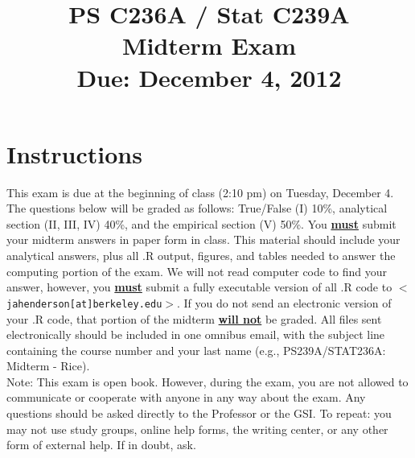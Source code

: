 \documentclass{article}
\title{PS C236A / Stat C239A \\  Midterm Exam \\ Due: December 4, 2012}
\date{}
\begin{document}
\maketitle
\vspace{-4em}
\section*{Instructions}





\noindent This exam is due at the beginning of class (2:10 pm) on
Tuesday, December 4. The questions below will be graded as follows:
True/False (I) 10\%, analytical section (II, III, IV) 40\%, and the
empirical section (V) 50\%.  You \underline{\bf must} submit your
midterm answers in paper form in class.  This material should include
your analytical answers, plus all .R output, figures, and tables
needed to answer the computing portion of the exam.  We will not read
computer code to find your answer, however, you \underline{\bf must}
submit a fully executable version of all .R code to
$<$\texttt{jahenderson[at]berkeley.edu}$>$. If you do not send an
electronic version of your .R code, that portion of the midterm
\underline{\bf will not} be graded.  All files sent electronically
should be included in one omnibus email, with the subject line containing the course number and your last name (e.g., PS239A/STAT236A: Midterm - Rice).\\


\noindent Note: This exam is open book.  However, during the exam,
you are not allowed to communicate or cooperate with anyone in
any way about the exam. Any questions should be asked directly to the
Professor or the GSI. To repeat: you may not use study groups, online
help forms, the writing center, or any other form of external help.
If in doubt, ask.
\end{document}
